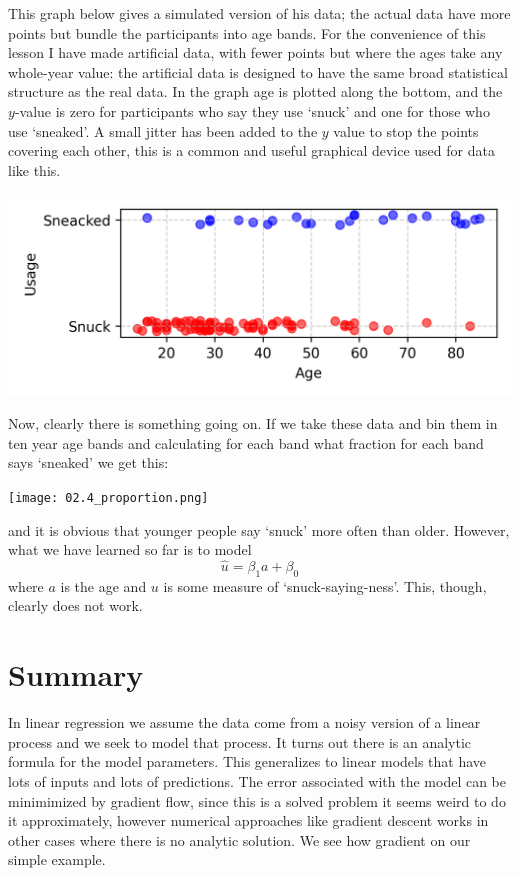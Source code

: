 \documentclass[12pt]{article}
\begin{document}
This graph below gives a simulated version of his data; the actual
data have more points but bundle the participants into age bands. For
the convenience of this lesson I have made artificial data, with fewer
points but where the ages take any whole-year value: the artificial
data is designed to have the same broad statistical structure as the
real data. In the graph age is plotted along the bottom, and the
$y$-value is zero for participants who say they use `snuck' and one
for those who use `sneaked'. A small jitter has been added to the $y$
value to stop the points covering each other, this is a common and
useful graphical device used for data like this.
\begin{center}
  \includegraphics[]{02.4_sneak.png}
  \end{center}
  Now, clearly there is something going on. If we take these data and
  bin them in ten year age bands and calculating for each band what
  fraction for each band says `sneaked' we get this:
\begin{center}
  \texttt{[image: 02.4\_proportion.png]}
  \end{center}
  and it is obvious that younger people say `snuck' more often than
  older. However, what we have learned so far is to model
\begin{equation}
\hat{u}=\beta_1 a+\beta_0
\end{equation}
where $a$ is the age and $u$ is some measure of
`snuck-saying-ness'. This, though, clearly does not work.

\section*{Summary}
In linear regression we assume the data come from a noisy version of a
linear process and we seek to model that process. It turns out there
is an analytic formula for the model parameters. This generalizes to
linear models that have lots of inputs and lots of predictions. The
error associated with the model can be minimimized by gradient flow,
since this is a solved problem it seems weird to do it approximately,
however numerical approaches like gradient descent works in other
cases where there is no analytic solution. We see how gradient on our
simple example.
\end{document}
